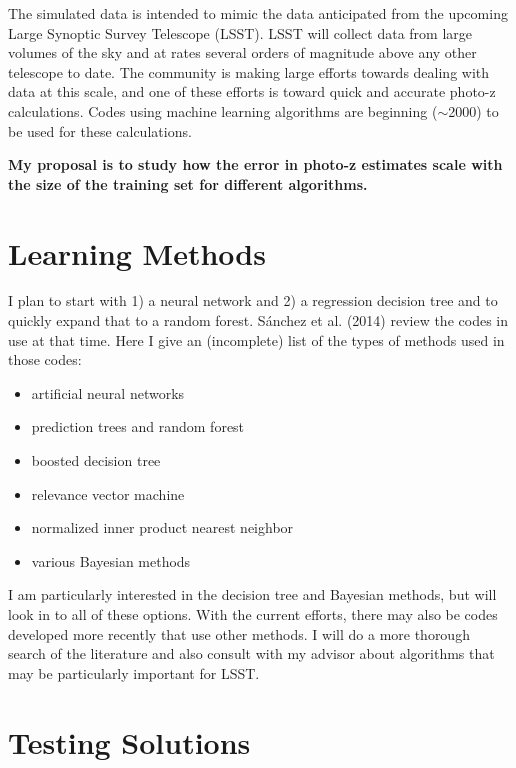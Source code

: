 \documentclass[13pt]{amsart}
\begin{document}
The simulated data is intended to mimic the data anticipated from the upcoming Large Synoptic Survey Telescope (LSST). LSST will collect data from large volumes of the sky and at rates several orders of magnitude above any other telescope to date. The community is making large efforts towards dealing with data at this scale, and one of these efforts is toward quick and accurate photo-z calculations. Codes using machine learning algorithms are beginning ($\sim$2000) to be used for these calculations.

\textbf{My proposal is to study how the error in photo-z estimates scale with the size of the training set for different algorithms.}




\section{Learning Methods}

I plan to start with 1) a neural network and 2) a regression decision tree and to quickly expand that to a random forest. S\'anchez et al. (2014) review the codes in use at that time. Here I give an (incomplete) list of the types of methods used in those codes:

\begin{itemize}
\item artificial neural networks
\item prediction trees and random forest
\item boosted decision tree
\item relevance vector machine
\item normalized inner product nearest neighbor
\item various Bayesian methods
\end{itemize}

I am particularly interested in the decision tree and Bayesian methods, but will look in to all of these options. With the current efforts, there may also be codes developed more recently that use other methods. I will do a more thorough search of the literature and also consult with my advisor about algorithms that may be particularly important for LSST.


\section{Testing Solutions}
\end{document}
